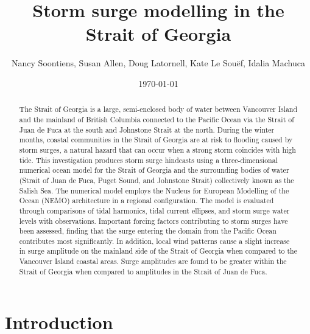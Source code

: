 \documentclass[pdftex,10pt]{article}
\title{Storm surge modelling in the Strait of Georgia}
\author{Nancy Soontiens, Susan Allen, Doug Latornell, Kate Le Sou\"{e}f, Idalia Machuca}
\date{\today}
\begin{document}
\maketitle

\begin{abstract}
The Strait of Georgia is a large, semi-enclosed body of water between Vancouver Island and the mainland of British Columbia connected to the Pacific Ocean via the Strait of Juan de Fuca at the south and Johnstone Strait at the north. During the winter months, coastal communities in the Strait of Georgia are at risk to flooding caused by storm surges, a natural hazard that can occur when a strong storm coincides with high tide. This investigation produces storm surge hindcasts using a three-dimensional numerical ocean model for the Strait of Georgia and the surrounding bodies of water (Strait of Juan de Fuca, Puget Sound, and Johnstone Strait) collectively known as the Salish Sea. The numerical model employs the Nucleus for European Modelling of the Ocean (NEMO) architecture in a regional configuration. The model is evaluated through comparisons of tidal harmonics, tidal current ellipses, and storm surge water levels with observations. Important forcing factors contributing to storm surges have been assessed, finding that the surge entering the domain from the Pacific Ocean contributes most significantly. In addition, local wind patterns cause a slight increase in surge amplitude on the mainland side of the Strait of Georgia when compared to the Vancouver Island coastal areas. Surge amplitudes are found to be greater within the Strait of Georgia when compared to amplitudes in the Strait of Juan de Fuca. 
\end{abstract}

\section{Introduction}\label{sec:intro}
\end{document}
